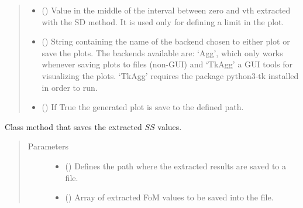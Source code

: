 \documentclass[letterpaper,10pt,english,openany, oneside]{sphinxmanual}
\begin{document}
\begin{fulllineitems}
\begin{fulllineitems}
\begin{quote}
\begin{description}
\begin{itemize}
\item {} 
 () \textendash{} Value in the middle of the interval between zero and vth extracted with the SD method.
It is used only for defining a limit in the plot.

\item {} 
 () \textendash{} String containing the name of the backend chosen to either plot or save the plots. The backends available are:
‘Agg’, which only works whenever saving plots to files (non-GUI) and ‘TkAgg’ a GUI tools for visualizing the plots.
‘TkAgg’ requires the package python3-tk installed in order to run.

\item {} 
 () \textendash{} If True the generated plot is save to the defined path.

\end{itemize}

\end{description}\end{quote}

\end{fulllineitems}


\begin{fulllineitems}
\label{\detokenize{index:fompy.fom.ss_ext.save_results_to_file}}
Class method that saves the extracted \(SS\) values.
\begin{quote}\begin{description}
\item[{Parameters}] \leavevmode\begin{itemize}
\item {} 
 () \textendash{} Defines the path where the extracted results are saved to a file.

\item {} 
 () \textendash{} Array of extracted FoM values to be saved into the file.

\end{itemize}

\end{description}\end{quote}

\end{fulllineitems}


\end{fulllineitems}
\end{document}
